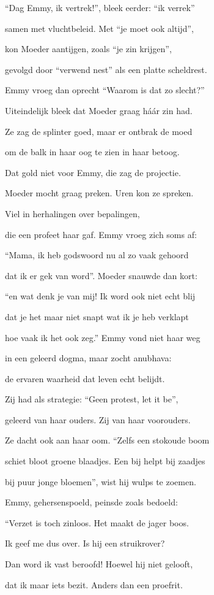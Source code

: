 “Dag Emmy, ik vertrek!”,
bleek eerder: “ik verrek”

samen met vluchtbeleid.
Met “je moet ook altijd”,

kon Moeder aantijgen,
zoals “je zin krijgen”,

gevolgd door “verwend nest”
als een platte scheldrest.

Emmy vroeg dan oprecht
“Waarom is dat zo slecht?”

Uiteindelijk bleek dat
Moeder graag háár zin had.

Ze zag de splinter goed,
maar er ontbrak de moed

om de balk in haar oog
te zien in haar betoog.

Dat gold niet voor Emmy,
die zag de projectie.

Moeder mocht graag preken.
Uren kon ze spreken.

Viel in herhalingen
over bepalingen,

die een profeet haar gaf.
Emmy vroeg zich soms af:

“Mama, ik heb godswoord
nu al zo vaak gehoord

dat ik er gek van word”.
Moeder snauwde dan kort:

“en wat denk je van mij!
Ik word ook niet echt blij

dat je het maar niet snapt
wat ik je heb verklapt

hoe vaak ik het ook zeg.”
Emmy vond niet haar weg

in een geleerd dogma,
maar zocht anubhava:

de ervaren waarheid
dat leven echt belijdt.

Zij had als strategie:
“Geen protest, let it be”,

geleerd van haar ouders.
Zij van haar voorouders.

Ze dacht ook aan haar oom.
“Zelfs een stokoude boom

schiet bloot groene blaadjes.
Een bij helpt bij zaadjes

bij puur jonge bloemen”,
wist hij wulps te zoemen.

Emmy, gehersenspoeld,
peinsde zoals bedoeld:

“Verzet is toch zinloos.
Het maakt de jager boos.

Ik geef me dus over.
Is hij een struikrover?

Dan word ik vast beroofd!
Hoewel hij niet gelooft,

dat ik maar iets bezit.
Anders dan een proefrit.

